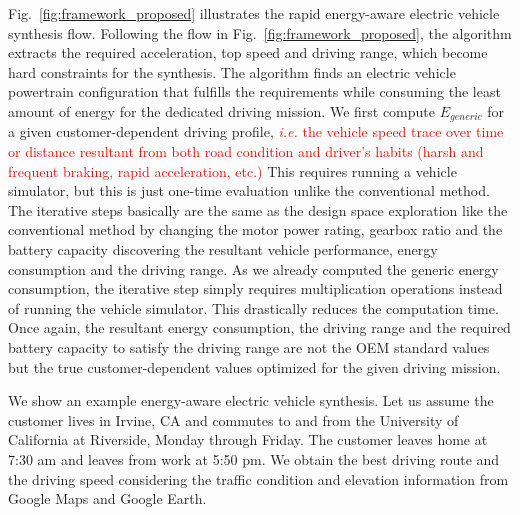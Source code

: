 \documentclass[journal]{IEEEtran}
\begin{document}
Fig.~\ref{fig:framework_proposed} illustrates the rapid energy-aware electric vehicle synthesis flow. 
Following the flow in Fig.~\ref{fig:framework_proposed}, the algorithm extracts the required acceleration, top speed and driving range, which become hard constraints for the synthesis. The algorithm finds an electric vehicle powertrain configuration that fulfills the requirements while consuming the least amount of energy for the dedicated driving mission. 
We first compute $E_{generic}$ for a given customer-dependent driving profile, \textcolor{red}{\textit{i.e.} the  vehicle speed trace over time or distance resultant from both road condition and driver's habits (harsh and frequent braking, rapid acceleration, etc.)} This requires running a vehicle simulator, but this is just one-time evaluation unlike the conventional method. The iterative steps basically are the same as the design space exploration like the conventional method by changing the motor power rating, gearbox ratio and the battery capacity discovering the resultant vehicle performance, energy consumption and the driving range. As we already computed the generic energy consumption, the iterative step simply requires multiplication operations instead of running the vehicle simulator. This drastically reduces the computation time. Once again, the resultant energy consumption, the driving range and the required battery capacity to satisfy the driving range are not the OEM standard values but the true customer-dependent values optimized for the given driving mission. 

We show an example energy-aware electric vehicle synthesis. Let us assume the customer lives in Irvine, CA and commutes to and from the University of California at Riverside, Monday through Friday. The customer leaves home at 7:30 am and leaves from work at 5:50 pm. We obtain the best driving route and the driving speed considering the traffic condition and elevation information from Google Maps and Google Earth.
\end{document}
